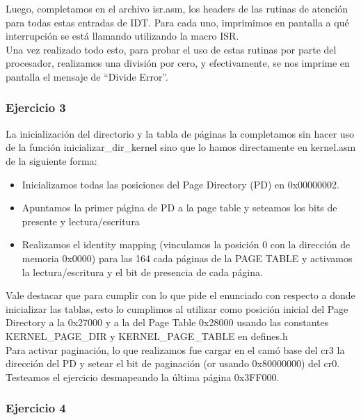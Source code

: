 \indent Luego, completamos en el archivo isr.asm, los headers de las rutinas de atención para todas estas entradas de IDT. Para cada uno, imprimimos en pantalla a qué interrupción se está llamando utilizando la macro ISR.\\

\indent Una vez realizado todo esto, para probar el uso de estas rutinas por parte del procesador,  realizamos una división por cero, y efectivamente, se nos imprime en pantalla el mensaje de ``Divide Error''.


\subsubsection{Ejercicio 3}
\indent La inicializaci\'on del directorio y la tabla de p\'aginas la completamos sin hacer uso de la funci\'on inicializar\_dir\_kernel sino que lo hamos directamente en kernel.asm de la siguiente forma:
\begin{itemize}
\item Inicializamos todas las posiciones del Page Directory (PD) en 0x00000002.
\item Apuntamos la primer página de PD a la page table y seteamos los bits de presente y lectura/escritura
\item Realizamos el identity mapping (vinculamos la posición 0 con la dirección de memoria 0x0000) para las 164 cada p\'aginas de la PAGE TABLE y activamos la lectura/escritura y el bit de presencia de cada página.
\end{itemize}

\indent Vale destacar que para cumplir con lo que pide el enunciado con respecto a donde inicializar las tablas, esto lo cumplimos al utilizar como posición inicial del Page Directory a la 0x27000 y a la del Page Table 0x28000	usando las constantes KERNEL\_PAGE\_DIR y KERNEL\_PAGE\_TABLE en defines.h\\

\indent Para activar paginación, lo que realizamos fue cargar en el camó base del cr3 la dirección del PD y setear el bit de paginación (or usando 0x80000000) del cr0.\\

\indent Testeamos el ejercicio desmapeando la \'ultima p\'agina 0x3FF000.\\


\subsubsection{Ejercicio 4}

